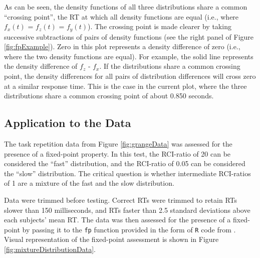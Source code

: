 \documentclass[a4paper, jou, natbib]{apa6}
\begin{document}
As can be seen, the density functions of all three distributions share a common ``crossing point'', the RT at which all density functions are equal (i.e., where $f_{x}(t)$ = $f_{z}(t)$ = $f_{y}(t)$). The crossing point is made clearer by taking successive subtractions of pairs of density functions (see the right panel of Figure \ref{fig:fpExample}). Zero in this plot represents a density difference of zero (i.e., where the two density functions are equal). For example, the solid line represents the density difference of $f_{z}$ - $f_{x}$. If the distributions share a common crossing point, the density differences for all pairs of distribution differences will cross zero at a similar response time. This is the case in the current plot, where the three distributions share a common crossing point of about 0.850 seconds.

\subsection{Application to the Data}
The task repetition data from Figure \ref{fig:grangeData} was assessed for the presence of a fixed-point property. In this test, the RCI-ratio of 20 can be considered the ``fast'' distribution, and the RCI-ratio of 0.05 can be considered the ``slow'' distribution. The critical question is whether intermediate RCI-ratios of 1 are a mixture of the fast and the slow distribution. 

Data were trimmed before testing. Correct RTs were trimmed to retain RTs slower than 150 milliseconds, and RTs faster than 2.5 standard deviations above each subjects' mean RT. The data was then assessed for the presence of a fixed-point by passing it to the \texttt{fp} function provided in the form of \texttt{R} code from \citet{VanMaanen2014}. Visual representation of the fixed-point assessment is shown in Figure \ref{fig:mixtureDistributionData}.
\end{document}
